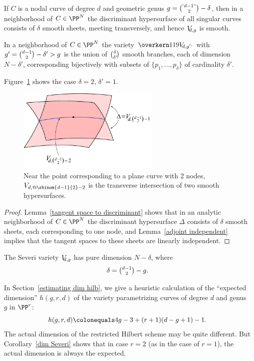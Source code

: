 \begin{corollary}\label{local geometry of Severi}
\hskip-1.6pt
If $C$ is a nodal curve of degree $d$
and
geometric genus
$g =\nobreak \tbinom{`d-1` `}{2}-\nobreak\delta$, then in a neighborhood of $C\in \PP^N$
the discriminant hypersurface of all singular curves consists of $\delta$ smooth sheets, meeting transversely, and hence
$\Vdg$ is smooth.

In a neighborhood
of
 $C \in \PP^N$
the variety
$\Vdgpbar$
with $g' =  \tbinom{d-1}{2}-\delta' >g$
is the union of $\tbinom{\delta}{\delta'\!}$ smooth branches, each of
dimension $N - \delta'$, corresponding bijectively with subsets of
$\{p_1,\dots,p_{\delta}\}$ of cardinality $\delta'$.
\meshing
\end{corollary}

Figure~\ref{Severi discriminant} shows the case $\delta=2$,  $\delta' = 1$.
\begin{figure}[b]\label{discriminant of a Severi locus}
\centerline {\includegraphics[height=1.6in]{"main/Fig07-3"}}
\vskip-8pt
 \caption{%
Near
the point corresponding to a plane curve with 2 nodes,
$V_{d,@\protect\sbinom{d-1}{2}-2}$ is the
transverse
intersection of two smooth hypersurfaces.}
 \label{Severi discriminant}
\end{figure}


\begin{proof}
Lemma~\ref{tangent space to discriminant} shows that in an analytic neighborhood of $C\in \PP^N$ the discriminant hypersurface $\Delta$  consists of $\delta$ smooth sheets, each corresponding to one node, and Lemma~\ref{adjoint independent} implies that the tangent spaces to these sheets are linearly independent.
\end{proof}

\begin{corollary}\label{dim Severi}
The  Severi variety $\Vdg$ has pure dimension $N - \delta$, where
$$\delta = \tbinom{d-1}{2} - g.$$
\end{corollary}

In Section~\ref{estimating dim hilb}, we give a heuristic calculation
%
%
of the ``expected dimension'' $h(g,r,d)$ of the variety parametrizing
curves of degree $d$ and genus $g$ in $\PP^r$:
$$
h(g,r,d) \colonequals  4g-3 + (r+1)(d-g+1) - 1.
$$
The actual dimension of the restricted Hilbert scheme may be quite different. But  Corollary~\ref{dim Severi} shows that in case $r=2$ (as in the case of $r=1$), the actual dimension is always the expected.



